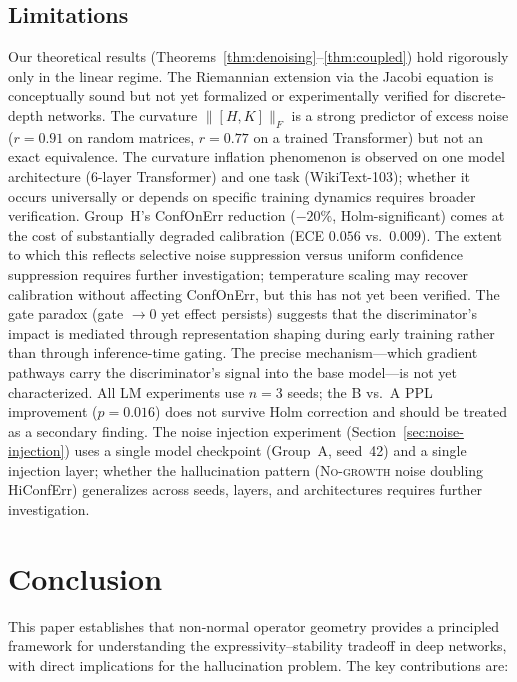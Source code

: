 \documentclass[11pt,a4paper]{article}
\theoremstyle{definition}
\begin{document}
\subsection{Limitations}

Our theoretical results (Theorems~\ref{thm:denoising}--\ref{thm:coupled})
hold rigorously only in the linear regime. The Riemannian extension
via the Jacobi equation is conceptually sound but not yet formalized
or experimentally verified for discrete-depth networks.
The curvature $\|[H,K]\|_F$ is a strong predictor of excess noise
($r = 0.91$ on random matrices, $r = 0.77$ on a trained Transformer)
but not an exact equivalence.
The curvature inflation phenomenon is observed on one model
architecture (6-layer Transformer) and one task (WikiText-103);
whether it occurs universally or depends on specific training
dynamics requires broader verification.
Group~H's ConfOnErr reduction ($-20\%$, Holm-significant) comes
at the cost of substantially degraded calibration (ECE $0.056$
vs.\ $0.009$). The extent to which this reflects selective noise
suppression versus uniform confidence suppression requires further
investigation; temperature scaling may recover calibration without
affecting ConfOnErr, but this has not yet been verified.
The gate paradox (gate $\to 0$ yet effect persists) suggests that
the discriminator's impact is mediated through representation
shaping during early training rather than through inference-time
gating. The precise mechanism---which gradient pathways carry
the discriminator's signal into the base model---is not yet
characterized.
All LM experiments use $n = 3$ seeds; the B vs.\ A PPL
improvement ($p = 0.016$) does not survive Holm correction and
should be treated as a secondary finding.
The noise injection experiment (Section~\ref{sec:noise-injection})
uses a single model checkpoint (Group~A, seed~42) and a single
injection layer; whether the hallucination pattern
(\textsc{No-growth} noise doubling HiConfErr) generalizes across
seeds, layers, and architectures requires further investigation.

\section{Conclusion}
\label{sec:conclusion}

This paper establishes that non-normal operator geometry provides a
principled framework for understanding the expressivity--stability
tradeoff in deep networks, with direct implications for the
hallucination problem. The key contributions are:
\end{document}
